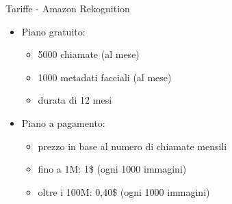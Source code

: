 %
\begin{frame}[t]{Tariffe - Amazon Rekognition}
\begin{itemize}
	\item Piano gratuito:
	\begin{itemize}
		\item 5000 chiamate (al mese)
		\item 1000 metadati facciali (al mese)
		\item durata di 12 mesi
	\end{itemize}
	\item Piano a pagamento:
	\begin{itemize}
		\item prezzo in base al numero di chiamate mensili
		\item fino a 1M: 1\$ (ogni 1000 immagini)
		\item oltre i 100M: 0,40\$ (ogni 1000 immagini)
	\end{itemize}
\end{itemize}
\end{frame}
%
